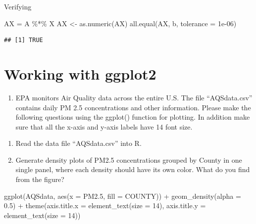 \documentclass[
]{article}
\newenvironment{Shaded}{\begin{snugshade}}{\end{snugshade}}
\newcommand{\AttributeTok}[1]{\textcolor[rgb]{0.77,0.63,0.00}{#1}}
\newcommand{\DecValTok}[1]{\textcolor[rgb]{0.00,0.00,0.81}{#1}}
\newcommand{\FloatTok}[1]{\textcolor[rgb]{0.00,0.00,0.81}{#1}}
\newcommand{\FunctionTok}[1]{\textcolor[rgb]{0.00,0.00,0.00}{#1}}
\newcommand{\NormalTok}[1]{#1}
\newcommand{\OtherTok}[1]{\textcolor[rgb]{0.56,0.35,0.01}{#1}}
\newcommand{\SpecialCharTok}[1]{\textcolor[rgb]{0.00,0.00,0.00}{#1}}
\providecommand{\tightlist}{%
  \setlength{\itemsep}{0pt}\setlength{\parskip}{0pt}}
\begin{document}
Verifying

\begin{Shaded}
\begin{Highlighting}[]
\NormalTok{AX }\OtherTok{=}\NormalTok{ A }\SpecialCharTok{\%*\%}\NormalTok{ X}
\NormalTok{AX }\OtherTok{\textless{}{-}} \FunctionTok{as.numeric}\NormalTok{(AX)}
\FunctionTok{all.equal}\NormalTok{(AX, b, }\AttributeTok{tolerance =} \FloatTok{1e{-}06}\NormalTok{)}
\end{Highlighting}
\end{Shaded}

\begin{verbatim}
## [1] TRUE
\end{verbatim}

\hypertarget{working-with-ggplot2}{%
\section{Working with ggplot2}\label{working-with-ggplot2}}

\begin{enumerate}
\def\labelenumi{\arabic{enumi}.}
\setcounter{enumi}{3}
\tightlist
\item
  EPA monitors Air Quality data across the entire U.S. The file
  ``AQSdata.csv'' contains daily PM 2.5 concentrations and other
  information. Please make the following questions using the ggplot()
  function for plotting. In addition make sure that all the x-axis and
  y-axis labels have 14 font size.
\end{enumerate}

\begin{enumerate}
\def\labelenumi{\alph{enumi}.}
\item
  Read the data file ``AQSdata.csv'' into R.
\item
  Generate density plots of PM2.5 concentrations grouped by County in
  one single panel, where each density should have its own color. What
  do you find from the figure?
\end{enumerate}

\begin{Shaded}
\begin{Highlighting}[]
\FunctionTok{ggplot}\NormalTok{(AQSdata, }\FunctionTok{aes}\NormalTok{(}\AttributeTok{x =}\NormalTok{ PM2}\FloatTok{.5}\NormalTok{, }\AttributeTok{fill =}\NormalTok{ COUNTY)) }\SpecialCharTok{+} \FunctionTok{geom\_density}\NormalTok{(}\AttributeTok{alpha =} \FloatTok{0.5}\NormalTok{) }\SpecialCharTok{+}
    \FunctionTok{theme}\NormalTok{(}\AttributeTok{axis.title.x =} \FunctionTok{element\_text}\NormalTok{(}\AttributeTok{size =} \DecValTok{14}\NormalTok{), }\AttributeTok{axis.title.y =} \FunctionTok{element\_text}\NormalTok{(}\AttributeTok{size =} \DecValTok{14}\NormalTok{))}
\end{Highlighting}
\end{Shaded}
\end{document}
